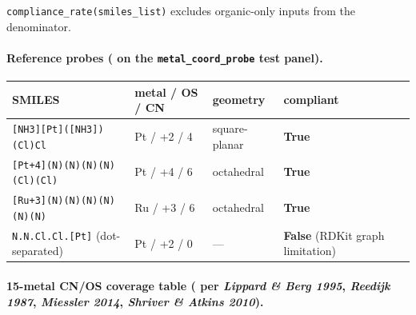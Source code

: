 \texttt{compliance\_rate(smiles\_list)} excludes organic-only
inputs from the denominator.

\paragraph{Reference probes (\MEASURED{} on the
\texttt{metal\_coord\_probe} test panel).}

\begin{center}
\small
\setlength{\tabcolsep}{4pt}
\begin{tabular}{lllll}
\toprule
\textbf{SMILES} & \textbf{metal / OS / CN} & \textbf{geometry} & \textbf{compliant} \\
\midrule
\texttt{[NH3][Pt]([NH3])(Cl)Cl}                & Pt / +2 / 4 & square-planar & \textbf{True} \\
\texttt{[Pt+4](N)(N)(N)(N)(Cl)(Cl)}            & Pt / +4 / 6 & octahedral    & \textbf{True} \\
\texttt{[Ru+3](N)(N)(N)(N)(N)(N)}              & Ru / +3 / 6 & octahedral    & \textbf{True} \\
\texttt{N.N.Cl.Cl.[Pt]} (dot-separated)       & Pt / +2 / 0 & ---           & \textbf{False} (RDKit graph limitation) \\
\bottomrule
\end{tabular}
\end{center}

\paragraph{15-metal CN/OS coverage table (\CITEDONLY{}
per \emph{Lippard \& Berg 1995}, \emph{Reedijk 1987},
\emph{Miessler 2014}, \emph{Shriver \& Atkins 2010}).}

